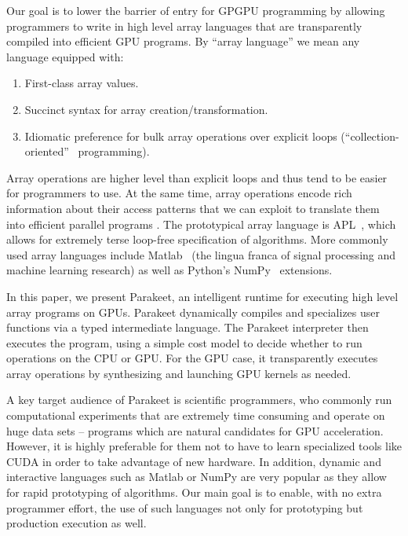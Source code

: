 \documentclass[preprint]{sigplanconf}
\begin{document}
Our goal is to lower the barrier of entry for GPGPU programming by allowing programmers to write in high level array languages that are transparently compiled into efficient GPU programs. By ``array language'' we mean any language equipped with:
\begin{enumerate}
\item First-class array values.
\item Succinct syntax for array creation/transformation.
\item Idiomatic preference for bulk array operations over explicit loops (``collection-oriented''~\cite{Sip91} programming).
\end{enumerate}

Array operations are higher level than explicit loops and thus tend to be easier for programmers to use. At the same time, array operations encode rich information about their access patterns that we can exploit to translate them into efficient parallel programs \cite{Ju94}. The prototypical array language is APL~\cite{Iverson62}, which allows for extremely terse loop-free specification of algorithms. More commonly used array languages include Matlab~\cite{Moler80} (the lingua franca of signal processing and machine learning research) as well as Python's NumPy~\cite{Oliphant07} extensions.

In this paper, we present Parakeet, an intelligent runtime for executing high level array programs on GPUs. Parakeet dynamically compiles and specializes user functions via a typed intermediate language.  The Parakeet interpreter then executes the program, using a simple cost model to decide whether to run operations on the CPU or GPU.  For the GPU case, it transparently executes array operations by synthesizing and launching GPU kernels as needed.

A key target audience of Parakeet is scientific programmers, who commonly run computational experiments that are extremely time consuming and operate on huge data sets -- programs which are natural candidates for GPU acceleration. However, it is highly preferable for them not to have to learn specialized tools like CUDA in order to take advantage of new hardware.  In addition, dynamic and interactive languages such as Matlab or NumPy are very popular as they allow for rapid prototyping of algorithms.  Our main goal is to enable, with no extra programmer effort, the use of such languages not only for prototyping but production execution as well.
\end{document}
